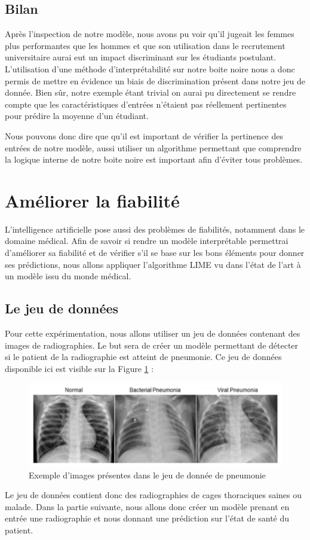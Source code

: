 \subsection{Bilan}
 Après l'inspection de notre modèle, nous avons pu voir qu'il jugeait les femmes plus performantes que les hommes et que son utilisation dans le recrutement universitaire aurai eut un impact discriminant sur les étudiants postulant. L'utilisation d'une méthode d'interprétabilité sur notre boite noire nous a donc permis de mettre en évidence un biais de discrimination présent dans notre jeu de donnée. Bien sûr, notre exemple étant trivial on aurai pu directement se rendre compte que les caractéristiques d'entrées n'étaient pas réellement pertinentes pour prédire la moyenne d'un étudiant.\par
 Nous pouvons donc dire que qu'il est important de vérifier la pertinence des entrées de notre modèle, aussi utiliser un algorithme permettant que comprendre la logique interne de notre boite noire est important afin d'éviter tous problèmes.

\section{Améliorer la fiabilité}
L'intelligence artificielle pose aussi des problèmes de fiabilités, notamment dans le domaine médical. Afin de savoir si rendre un modèle interprétable permettrai d'améliorer sa fiabilité et de vérifier s'il se base sur les bons éléments pour donner ses prédictions, nous allons appliquer l'algorithme LIME vu dans l'état de l'art à un modèle issu du monde médical.

\subsection{Le jeu de données}
Pour cette expérimentation, nous allons utiliser un jeu de données contenant des images de radiographies. Le but sera de créer un modèle permettant de détecter si le patient de la radiographie est atteint de pneumonie. Ce jeu de données disponible ici \cite{kagglePneumonia} est visible sur la Figure \ref{pneumoniaImg} :
\begin{figure}[h]
    \includegraphics[scale=0.7]{src_img/pneumoniaImg.png}
    \caption{Exemple d'images présentes dans le jeu de donnée de pneumonie}
    \label{pneumoniaImg}
\end{figure}
Le jeu de données contient donc des radiographies de cages thoraciques saines ou malade. Dans la partie suivante, nous allons donc créer un modèle prenant en entrée une radiographie et nous donnant une prédiction sur l'état de santé du patient.

